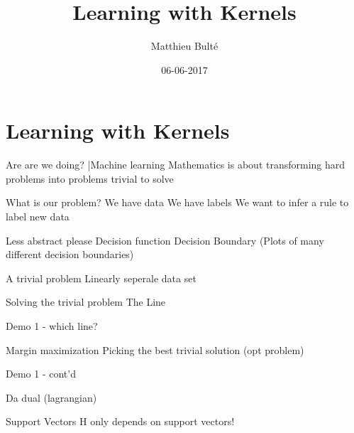 \documentclass[bigger]{beamer}
\author{Matthieu Bulté}
\date{06-06-2017}
\title{Learning with Kernels}
\begin{document}
\maketitle

\section{Learning with Kernels}
\label{sec-1}

\begin{frame}[label=sec-1-1]{Are are we doing?}
\bar{Machine learning} Mathematics is about transforming hard problems
into problems trivial to solve
\end{frame}

\begin{frame}[label=sec-1-2]{What is our problem?}
We have data
We have labels
We want to infer a rule to label new data
\end{frame}


\begin{frame}[label=sec-1-3]{Less abstract please}
Decision function
Decision Boundary
(Plots of many different decision boundaries)
\end{frame}

\begin{frame}[label=sec-1-4]{A trivial problem}
Linearly seperale data set
\end{frame}

\begin{frame}[label=sec-1-5]{Solving the trivial problem}
The Line
\end{frame}

\begin{frame}[label=sec-1-6]{Demo 1 - which line?}
\end{frame}

\begin{frame}[label=sec-1-7]{Margin maximization}
Picking the best trivial solution
(opt problem)
\end{frame}

\begin{frame}[label=sec-1-8]{Demo 1 - cont'd}
\end{frame}

\begin{frame}[label=sec-1-9]{Da dual}
(lagrangian)
\end{frame}

\begin{frame}[label=sec-1-10]{Support Vectors}
H only depends on support vectors!
\end{frame}
\end{document}
